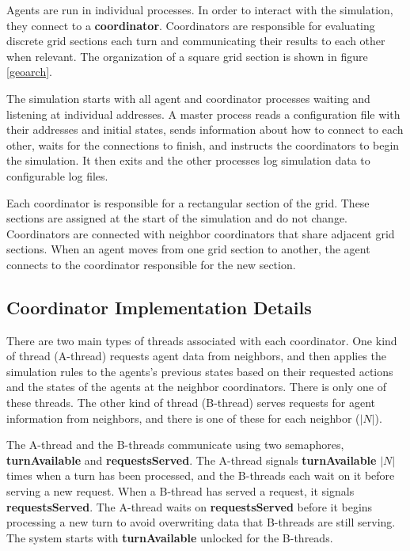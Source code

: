 Agents are run in individual processes. In order to interact with the simulation, they connect to a
\textbf{coordinator}. Coordinators are responsible for evaluating discrete grid sections each turn
and communicating their results to each other when relevant. The organization of a square grid
section is shown in figure \ref{geoarch}.

The simulation starts with all agent and coordinator processes waiting and listening at individual
addresses. A master process reads a configuration file with their addresses and initial states,
sends information about how to connect to each other, waits for the connections to finish, and
instructs the coordinators to begin the simulation. It then exits and the other processes log
simulation data to configurable log files.

Each coordinator is responsible for a rectangular section of the grid. These sections are assigned
at the start of the simulation and do not change. Coordinators are connected with neighbor
coordinators that share adjacent grid sections. When an agent moves from one grid section to
another, the agent connects to the coordinator responsible for the new section.

\subsection{Coordinator Implementation Details}

There are two main types of threads associated with each coordinator. One kind of thread (A-thread)
requests agent data from neighbors, and then applies the simulation rules to the agents's previous
states based on their requested actions and the states of the agents at the neighbor coordinators.
There is only one of these threads. The other kind of thread (B-thread) serves requests for agent
information from neighbors, and there is one of these for each neighbor ($|N|$).

The A-thread and the B-threads communicate using two semaphores, \textbf{turnAvailable} and
\textbf{requestsServed}. The A-thread signals \textbf{turnAvailable} $|N|$ times when a turn has
been processed, and the B-threads each wait on it before serving a new request. When a B-thread has
served a request, it signals \textbf{requestsServed}. The A-thread waits on \textbf{requestsServed}
before it begins processing a new turn to avoid overwriting data that B-threads are still serving.
The system starts with \textbf{turnAvailable} unlocked for the B-threads.

